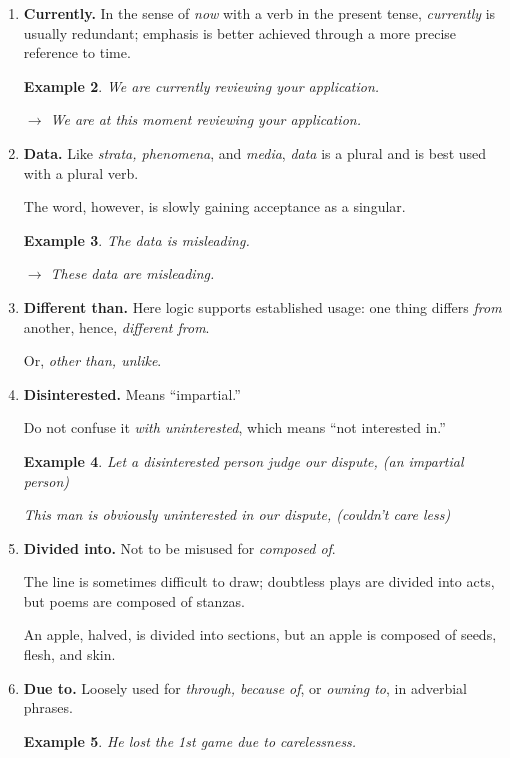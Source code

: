 \documentclass{book}
\numberwithin{equation}{section}
\newtheorem{example}{Example}[chapter]
\begin{document}
\begin{enumerate}
\begin{example}
        $\to$ I knew they would cope with the situation.
    \end{example}
    \item \textbf{Currently.} In the sense of \textit{now} with a verb in the present tense, \textit{currently} is usually redundant; emphasis is better achieved through a more precise reference to time.
    \begin{example}
        We are currently reviewing your application.
        
        $\to$ We are at this moment reviewing your application.
    \end{example}
    \item \textbf{Data.} Like \textit{strata, phenomena}, and \textit{media}, \textit{data} is a plural and is best used with a plural verb.
    
    The word, however, is slowly gaining acceptance as a singular.
    \begin{example}
        The data is misleading.
        
        $\to$ These data are misleading.
    \end{example}
    \item \textbf{Different than.} Here logic supports established usage: one thing differs \textit{from} another, hence, \textit{different from}.
    
    Or, \textit{other than, unlike}.
    \item \textbf{Disinterested.} Means ``impartial.''
    
    Do not confuse it \textit{with uninterested}, which means ``not interested in.''
    \begin{example}
        Let a disinterested person judge our dispute, (an impartial person)
        
        This man is obviously uninterested in our dispute, (couldn't care less)
    \end{example}
    \item \textbf{Divided into.} Not to be misused for \textit{composed of}.
    
    The line is sometimes difficult to draw; doubtless plays are divided into acts, but poems are composed of stanzas.
    
    An apple, halved, is divided into sections, but an apple is composed of seeds, flesh, and skin.
    \item \textbf{Due to.} Loosely used for \textit{through, because of}, or \textit{owning to}, in adverbial phrases.
    \begin{example}
        He lost the 1st game due to carelessness.
        

\end{example}
\end{enumerate}
\end{document}
